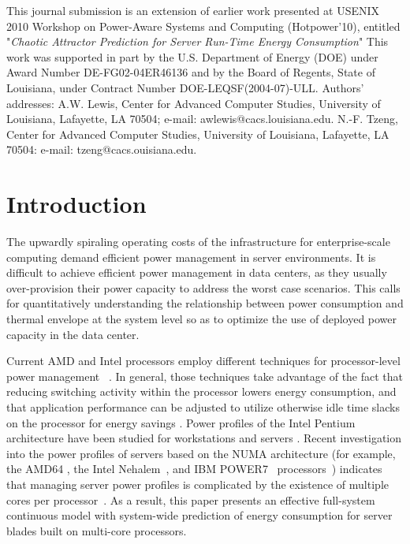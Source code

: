 \documentclass[prodmode,acmtaco,pdftex]{acmsmall}
\begin{document}
\begin{bottomstuff}
  This journal submission is an
  extension of earlier work presented at USENIX 2010 Workshop on
  Power-Aware Systems and Computing (Hotpower'10), entitled
  "\textit{Chaotic Attractor Prediction for Server Run-Time Energy
    Consumption}" \newline%
   \newline
  This work was supported in part by the U.S. Department of Energy (DOE)
  under Award Number DE-FG02-04ER46136 and by the Board of Regents,
  State of Louisiana, under Contract Number
  DOE-LEQSF(2004-07)-ULL. \newline
  \newline
  Authors' addresses: A.W. Lewis, Center for Advanced Computer Studies,
  University of Louisiana, Lafayette, LA 70504; e-mail:
  awlewis@cacs.louisiana.edu.  N.-F. Tzeng, Center for Advanced Computer
  Studies, University of Louisiana, Lafayette, LA 70504: e-mail:
  tzeng@cacs.ouisiana.edu.\newline
\end{bottomstuff}
\maketitle
\section{Introduction}
\label{sec:Introduction}
The upwardly spiraling operating costs of the infrastructure for
enterprise-scale computing demand efficient power management in server
environments.  It is difficult to achieve efficient power management in
data centers, as they usually over-provision their power capacity to
address the worst case scenarios. This calls for quantitatively
understanding the relationship between power consumption and thermal
envelope at the system level so as to optimize the use of deployed power
capacity in the data center.

Current AMD and Intel processors employ different techniques for
processor-level power management ~\cite{AMD2008b,Intel2009}. In general,
those techniques take advantage of the fact that reducing switching
activity within the processor lowers energy consumption, and that
application performance can be adjusted to utilize otherwise idle time
slacks on the processor for energy savings \cite{Contreras2005}.  Power
profiles of the Intel Pentium architecture have been studied for
workstations \cite{Isci2003a,Isci2003b,Isci2006} and servers
\cite{Bircher2004,Bircher2007,Lee2005}. Recent investigation into the
power profiles of servers based on the {NUMA} architecture (for example,
the AMD64 \cite{AMD2007}, the Intel Nehalem~\cite{Intel2009}, and IBM
POWER7~ processors~\cite{Ware2010,Brochard2010}) indicates that managing
server power profiles is complicated by the existence of multiple cores
per
processor~\cite{Kansal2010,Tsirogiannis2010,Lewis2010,McCullough2011}.
As a result, this paper presents an effective full-system continuous
model with system-wide prediction of energy consumption for server
blades built on multi-core processors.
\end{document}
